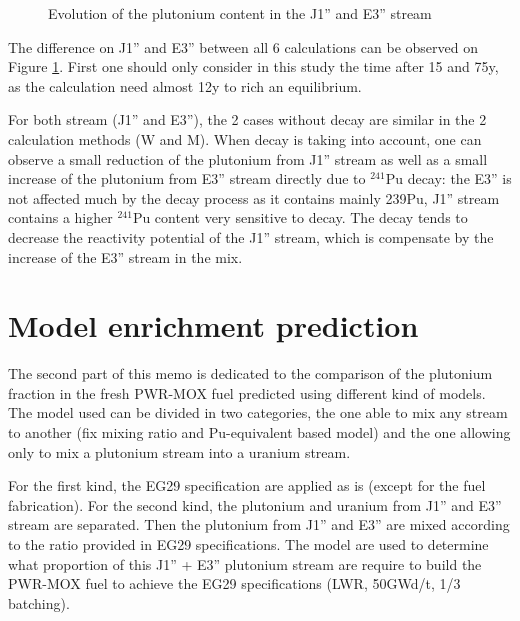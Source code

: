 \documentclass[10pt]{article}
\begin{document}
\begin{figure}[h!]
  \centering
  \caption{Evolution of the plutonium content in the J1'' and  E3'' stream\label{fig:MW_flow} }
\end{figure}

The difference on J1'' and E3'' between all 6 calculations can be observed on
Figure \ref{fig:MW_flow}. First one should only consider in this study the time
after 15 and 75y, as the calculation need almost 12y to rich an equilibrium. 

For both stream (J1'' and E3''), the 2 cases without decay are similar in the 2
calculation methods (W and M). When decay is taking into account, one can
observe a small reduction of the plutonium from  J1'' stream as well as a small
increase of the plutonium from E3'' stream directly due to $^{241}$Pu decay: the E3''
is not affected much by the decay process as it contains mainly 239Pu, J1''
stream contains a higher $^{241}$Pu content very sensitive to decay.  The decay tends
to decrease the reactivity potential of the J1'' stream, which is compensate by
the increase of the E3'' stream in the mix.


\section{Model enrichment prediction}

The second part of this memo is dedicated to the comparison of the plutonium
fraction in the fresh PWR-MOX fuel predicted using different kind of models. The
model used can be divided in two categories, the one able to mix any stream to
another (fix mixing ratio and Pu-equivalent based model) and the one allowing
only to mix a plutonium stream into a uranium stream.  

For the first kind, the EG29 specification are applied as is (except for the
fuel fabrication). For the second kind, the plutonium and uranium from J1'' and
E3'' stream are separated.  Then the plutonium from J1'' and E3'' are mixed
according to the ratio provided in EG29 specifications. The model are used to
determine what proportion of this J1'' + E3'' plutonium stream are require to
build the PWR-MOX fuel to achieve the EG29 specifications (LWR, 50GWd/t, 1/3
batching).
\end{document}
